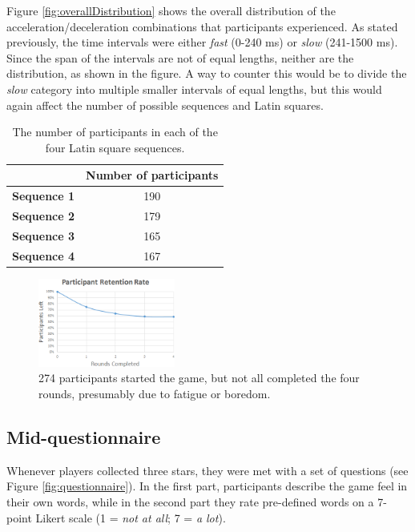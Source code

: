Figure \ref{fig:overallDistribution} shows the overall distribution of the acceleration/deceleration combinations that participants experienced. As stated previously, the time intervals were either \textit{fast} (0-240 ms) or \textit{slow} (241-1500 ms). Since the span of the intervals are not of equal lengths, neither are the distribution, as shown in the figure. A way to counter this would be to divide the \textit{slow} category into multiple smaller intervals of equal lengths, but this would again affect the number of possible sequences and Latin squares.

\begin{table} \centering
\caption{The number of participants in each of the four Latin square sequences.}
\label{table:latinSequenceNumber}
\begin{tabular}{cc}
\toprule
& \textbf{Number of participants}\\
\midrule
\textbf{Sequence 1} & 190\\
\textbf{Sequence 2} & 179\\
\textbf{Sequence 3} & 165\\
\textbf{Sequence 4} & 167\\
\bottomrule
\end{tabular}
\end{table}

\begin{figure}[htbp]
\centering
\includegraphics[width=0.4\textwidth]{Pics/retetionRate}
\caption{274 participants started the game, but not all completed the four rounds, presumably due to fatigue or boredom.}
\label{fig:retention}
\end{figure}

\subsection{Mid-questionnaire}
Whenever players collected three stars, they were met with a set of questions (see Figure \ref{fig:questionnaire}). In the first part, participants describe the game feel in their own words, while in the second part they rate pre-defined words on a 7-point Likert scale (1 = \textit{not at all}; 7 = \textit{a lot}).

